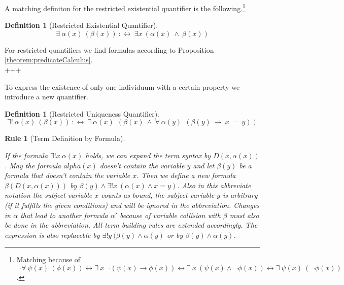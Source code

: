 \documentclass[a4paper,german,10pt,twoside]{book}
\newtheorem{rul}{Rule}
\theoremstyle{definition}
\newtheorem{defn}[thm]{Definition}
\theoremstyle{remark}
\begin{document}
\par
A matching definiton for the restricted existential quantifier is the following.\footnote{Matching because of $\neg \forall \ \psi(x) \ (\phi(x)) \leftrightarrow \exists \ x \ \neg (\psi(x) \rightarrow \phi(x)) \leftrightarrow \exists \ x \ (\psi(x) \land \neg\phi(x)) \leftrightarrow \exists \ \psi(x) \ (\neg\phi(x))$.}

\begin{defn}[Restricted Existential Quantifier]
\label{definition:restrictedExistentialQuantifier} \hypertarget{definition:restrictedExistentialQuantifier}{}
$$\exists \ \alpha(x) \ (\beta(x))\ :\leftrightarrow \ \exists x\ (\alpha(x)\ \land \ \beta(x))$$

\end{defn}




For restricted quantifiers we find formulas according to Proposition \ref{theorem:predicateCalculus}.
\\
+++


\par
To express the existence of only one individuum with a certain property we introduce a new quantifier.

\begin{defn}[Restricted Uniqueness Quantifier]
\label{definition:restrictedUniquenessQuantifier} \hypertarget{definition:restrictedUniquenessQuantifier}{}
$$\exists! \ \alpha(x) \ (\beta(x))\ :\leftrightarrow \ \exists \ \alpha(x)\ \ (\beta(x)\ \land \ \forall \ \alpha(y)\ \ (\beta(y)\ \rightarrow \ x \ =  \ y))$$

\end{defn}




\begin{rul}[Term Definition by Formula]\hypertarget{rule:termdef}{}
If the formula $\exists! x \ \alpha(x)$ holds, we can expand the term syntax by $D(x, \alpha(x))$. May the formula $alpha(x)$ doesn't contain the variable $y$ and let $\beta(y)$ be a formula that doesn't contain the variable $x$. Then we define a new formula $\beta(D(x, \alpha(x)))$ by $\beta(y) \land \exists! x \ (\alpha(x) \land x = y)$. Also in this abbreviate notation the subject variable $x$ counts as bound, the subject variable $y$ is arbitrary (if it fulfills the given conditions) and will be ignored in the abbreviation. Changes in $\alpha$ that lead to another formula $\alpha'$ because of variable collision with $\beta$ must also be done in the abbreviation. All term building rules are extended accordingly. The expression is also replaceble by $\exists! y \ (\beta(y) \land \alpha(y)$ or by $\beta(y) \land \alpha(y)$.
\end{rul}
\end{document}
